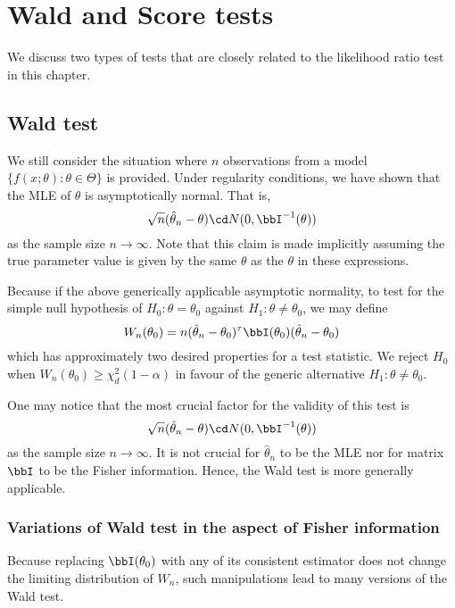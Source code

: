 
\chapter{Wald and Score tests}

We discuss two types of tests that are closely related to
the likelihood ratio test in this chapter.

\section{Wald test}
We still consider the situation where $n$ \iid observations from
a model $\{f(x; \theta): \theta \in \Theta\}$ is provided.
Under regularity conditions, we have shown that the MLE of $\theta$ is
asymptotically normal. That is,
\[
\sqrt{n} (\hat \theta_n - \theta) \cd N(0, \bbI^{-1}( \theta))
\]
as the sample size $n \to \infty$.
Note that this claim is made implicitly assuming the true parameter
value is given by the same $\theta$ as the $\theta$ in these expressions.

Because if the above generically applicable asymptotic normality, 
to test for the simple null hypothesis of
$H_0: \theta = \theta_0$ against $H_1: \theta \neq \theta_0$,  
we may define
\[
W_n(\theta_0) 
= n  (\hat \theta_n - \theta_0)^\tau \bbI(\theta_0)  (\hat \theta_n - \theta_0)
\]
which has approximately two desired properties for a test statistic.
We reject $H_0$ when $W_n(\theta_0) \geq \chi_d^2(1 - \alpha)$
in favour of the generic alternative $H_1: \theta \neq \theta_0$.

One may notice that the most crucial factor for the validity of this test is
\[
\sqrt{n} (\hat \theta_n - \theta) \cd N(0, \bbI^{-1}( \theta))
\]
as the sample size $n \to \infty$.
It is not crucial for $\hat \theta_n$ to be the MLE nor
for matrix $\bbI$ to be the Fisher information.
Hence, the Wald test is more generally applicable.

\subsection{Variations of Wald test in the aspect of Fisher information}
Because replacing $\bbI(\theta_0)$ with any of its consistent estimator
does not change the limiting distribution of $W_n$, 
such manipulations lead to many versions of the Wald test.

